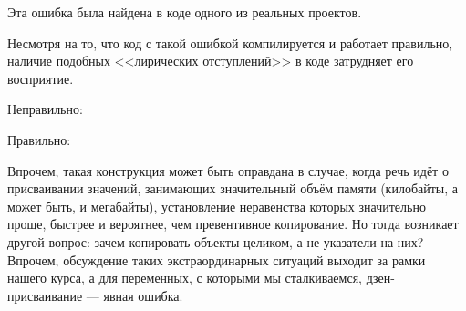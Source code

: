 \begin{typerror}
	\label{TE_if-not-equals-make-equal}

	Эта ошибка была найдена в коде одного из реальных проектов.

	Несмотря на то, что код с такой ошибкой компилируется и работает правильно,
	наличие подобных <<лирических отступлений>> в коде затрудняет его восприятие.

	Неправильно:

	Правильно:

	Впрочем, такая конструкция может быть оправдана в случае,
	когда речь идёт о присваивании значений, занимающих значительный объём памяти (килобайты, а может быть, и мегабайты),
	установление неравенства которых значительно проще, быстрее и вероятнее, чем превентивное копирование.
	Но тогда возникает другой вопрос: зачем копировать объекты целиком, а не указатели на них?
	Впрочем, обсуждение таких экстраординарных ситуаций выходит за рамки нашего курса,
	а для переменных, с которыми мы сталкиваемся, дзен-присваивание --- явная ошибка.

\end{typerror}
